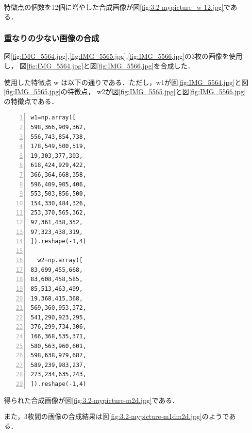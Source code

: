 \documentclass[autodetect-engine,dvi=dvipdfmx,ja=standard,
               a4j,11pt]{bxjsarticle}
\begin{document}
特徴点の個数を12個に増やした合成画像が図\ref{fig:3.2-mypicture_w-12.jpg}である．


\subsubsection{重なりの少ない画像の合成}
図\ref{fig:IMG_5564.jpg},\ref{fig:IMG_5565.jpg},\ref{fig:IMG_5566.jpg}の3枚の画像を使用し，
図\ref{fig:IMG_5564.jpg}と図\ref{fig:IMG_5566.jpg}を合成した．


使用した特徴点 w は以下の通りである．ただし，w1が図\ref{fig:IMG_5564.jpg}と図\ref{fig:IMG_5565.jpg}の特徴点，
w2が図\ref{fig:IMG_5565.jpg}と図\ref{fig:IMG_5566.jpg}の特徴点である．
\begin{Verbatim}[numbers=left, xleftmargin=10mm, numbersep=6pt,
                    fontsize=\small, baselinestretch=0.8]
  w1=np.array([
598,366,909,362,
556,743,854,738,
178,549,500,519,
19,303,377,303,
618,424,929,422,
366,364,668,358,
596,409,905,406,
553,503,856,500,
154,330,484,326,
253,370,565,362,
97,361,438,352,
97,323,438,319,
]).reshape(-1,4)

  w2=np.array([
83,699,455,668,
83,608,458,585,
85,513,463,499,
19,368,415,368,
569,360,953,372,
541,290,923,295,
376,299,734,306,
166,368,535,371,
580,563,960,601,
598,638,979,687,
589,239,983,237,
273,234,635,243,
]).reshape(-1,4)
\end{Verbatim}

得られた合成画像が図\ref{fig:3.2-mypicture-m2d.jpg}である．

また，3枚間の画像の合成結果は図\ref{fig:3.2-mypicture-m1dm2d.jpg}のようである．
\end{document}
